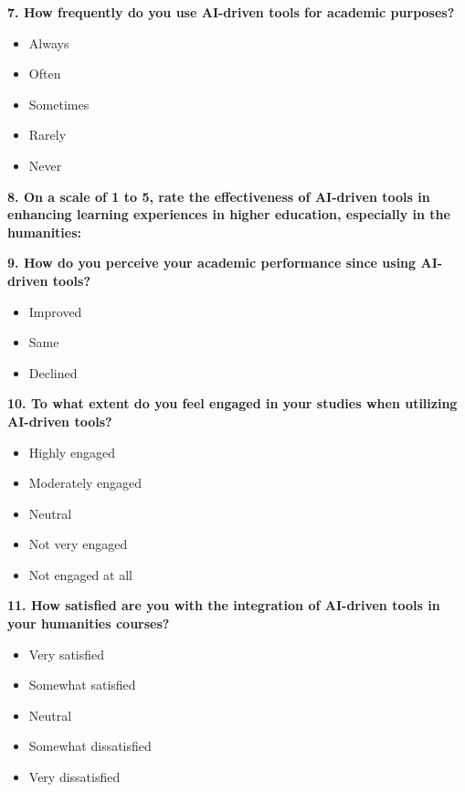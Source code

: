 \noindent\textbf{7.  How frequently do you use AI-driven tools for academic purposes?}
\begin{itemize}
	\item[\checkbox] Always
	\item[\checkbox] Often
	\item[\checkbox] Sometimes
	\item[\checkbox] Rarely
	\item[\checkbox] Never
\end{itemize}

\noindent\textbf{8. On a scale of 1 to 5, rate the effectiveness of AI-driven tools in enhancing learning experiences in higher education, especially in the humanities:}

\bigskip
\begin{Center}
\end{Center}


\noindent\textbf{9.  How do you perceive your academic performance since using AI-driven tools?}
\begin{itemize}
	\item[\checkbox] Improved
	\item[\checkbox] Same
	\item[\checkbox] Declined
\end{itemize}


\noindent\textbf{10. To what extent do you feel engaged in your studies when utilizing AI-driven tools?}
\begin{itemize}
	\item[\checkbox] Highly engaged
	\item[\checkbox] Moderately engaged
	\item[\checkbox] Neutral
	\item[\checkbox] Not very engaged
	\item[\checkbox] Not engaged at all
\end{itemize}

\noindent\textbf{11. How satisfied are you with the integration of AI-driven tools in your humanities courses?}
\begin{itemize}
	\item[\checkbox] Very satisfied
	\item[\checkbox] Somewhat satisfied
	\item[\checkbox] Neutral
	\item[\checkbox] Somewhat dissatisfied
	\item[\checkbox] Very dissatisfied
\end{itemize}

